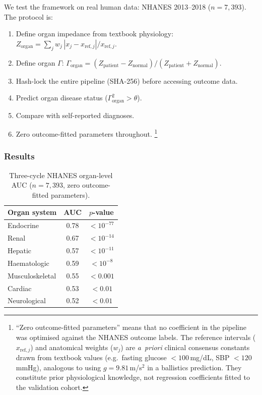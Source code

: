 \documentclass[aps,pre,twocolumn,superscriptaddress,floatfix]{revtex4-2}
\begin{document}
We test the framework on real human data:
NHANES 2013--2018 ($n = 7{,}393$).
The protocol is:
\begin{enumerate}
  \item Define organ impedance from textbook physiology:
    $Z_{\text{organ}} = \sum_j w_j\,|x_j - x_{\text{ref},j}|
    / x_{\text{ref},j}$.
  \item Define organ $\Gamma$:
    $\Gamma_{\text{organ}} = (Z_{\text{patient}} -
    Z_{\text{normal}}) / (Z_{\text{patient}} +
    Z_{\text{normal}})$.
  \item Hash-lock the entire pipeline (SHA-256) before
    accessing outcome data.
  \item Predict organ disease status
    ($\Gamma_{\text{organ}}^2 > \theta$).
  \item Compare with self-reported diagnoses.
  \item Zero outcome-fitted parameters throughout.%
    \footnote{``Zero outcome-fitted parameters'' means that no
    coefficient in the pipeline was optimised against
    the NHANES outcome labels.
    The reference intervals ($x_{\text{ref},j}$) and
    anatomical weights ($w_j$) are \emph{a~priori}
    clinical consensus constants drawn from textbook values
    (e.g.\ fasting glucose $<100$\,mg/dL,
    SBP $<120$\,mmHg), analogous to using
    $g = 9.81$\,m/s$^2$ in a ballistics prediction.
    They constitute prior physiological knowledge, not
    regression coefficients fitted to the validation cohort.}
\end{enumerate}

\subsubsection{Results}

\begin{table}[h]
\centering
\caption{Three-cycle NHANES organ-level AUC
($n = 7{,}393$, zero outcome-fitted parameters).}
\label{tab:3cycle}
\begin{tabular}{lcc}
\toprule
Organ system & AUC & $p$-value \\
\midrule
Endocrine    & 0.78 & $< 10^{-77}$ \\
Renal        & 0.67 & $< 10^{-14}$ \\
Hepatic      & 0.57 & $< 10^{-11}$ \\
Haematologic & 0.59 & $< 10^{-8}$ \\
Musculoskeletal & 0.55 & $< 0.001$ \\
Cardiac      & 0.53 & $< 0.01$ \\
Neurological & 0.52 & $< 0.01$ \\
\bottomrule
\end{tabular}
\end{table}
\end{document}
